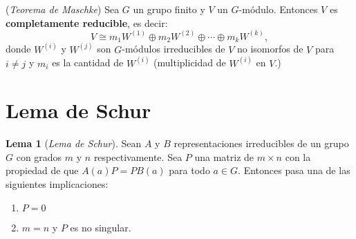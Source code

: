 \documentclass[12pt]{book}
\theoremstyle{definition}
\newtheorem{lemma}[theorem]{Lema}
\newcounter{in}
\newcounter{ini}
\begin{document}
\begin{mdframed}
  (\textit{Teorema de Maschke}) Sea $G$ un grupo finito y $V$ un
  $G$-módulo. Entonces $V$ es \textbf{completamente reducible}, es
  decir:
  \begin{equation}
    \label{eq:95}
    V \cong m_1W^{(1)} \oplus m_2W^{(2)} \oplus  \cdots \oplus m_kW^{(k)}, 
  \end{equation}
  donde $W^{(i)}$ y $W^{(j)}$ son $G$-módulos irreducibles de $V$ no
  isomorfos de $V$ para $i \neq j$ y $m_i$ es la cantidad de $W^{(i)}$
  (multiplicidad de $W^{(i)}$ en $V$.)
\end{mdframed}
\section{Lema de Schur}
\label{sec:schur}

\begin{lemma}[\textit{Lema de Schur}]
  \label{l3_1}
  Sean $A$ y $B$ representaciones irreducibles de un grupo $G$ con
grados $m$ y $n$ respectivamente. Sea $P$ una matriz de $m \times n$
con la propiedad de que $A(a)P=PB(a)$ para todo $a \in G$. Entonces pasa una de las siguientes  implicaciones:
  \begin{enumerate}
  \item $P=0$
  \item $m=n$ y $P$ es no singular.
  \end{enumerate}
\end{lemma}
\end{document}
